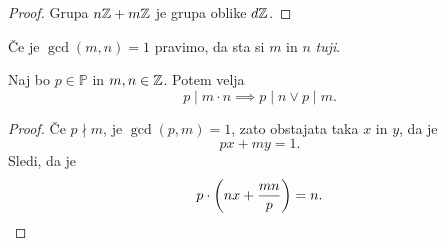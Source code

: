 \begin{proof}
Grupa $n \mathbb{Z} + m \mathbb{Z}$ je grupa oblike $d \mathbb{Z}$.
\end{proof}

\begin{definicija}
Če je $\gcd(m,n) = 1$ pravimo, da sta si $m$ in $n$
\emph{tuji}.
\end{definicija}

\begin{lema}[Evklid]
Naj bo $p \in \mathbb{P}$ in $m, n \in \mathbb{Z}$. Potem velja
\[
p \mid m \cdot n \implies p \mid n \lor p \mid m.
\]
\end{lema}

\begin{proof}
Če $p \nmid m$, je $\gcd(p,m) = 1$, zato obstajata taka $x$ in $y$,
da je
\[
px + my = 1.
\]
Sledi, da je
\[
p \cdot \left(nx + \frac{mn}{p} \right) = n. \qedhere
\]
\end{proof}
